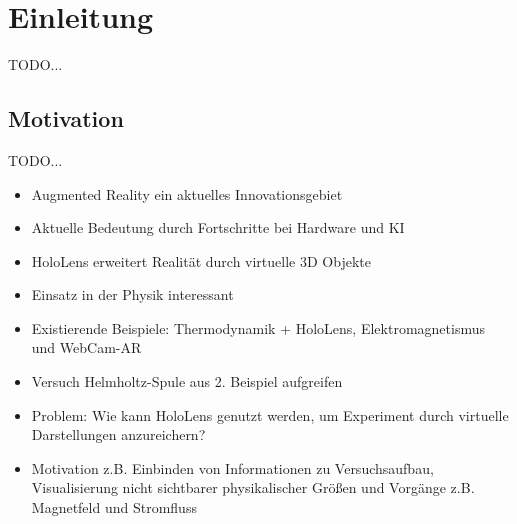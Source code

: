 \section{Einleitung}
\label{sec-1}
\begin{comment}
\begin{center}
	\fbox{
		\parbox{0.9\linewidth}{
			\textit{Ziel des Kapitels:}\\
			Arbeit motivieren, an die Fragestellung heranführen und diese formulieren\\
			\textit{Inhalte:}
			\begin{itemize}
				\item MR kurz vorstellen, aktuelle Bedeutung hervorheben, HoloLens als aktuelles Device und Anhaltspunkt nutzen
				\item Anwendung in der Physik Lehre einleiten und motivieren
				\item Fragestellung, Ziel und Struktur der Arbeit
			\end{itemize}
			
			\textit{Wichtige Literatur:}	
			\begin{itemize}
				\item Physics holo.lab learning experience: using smartglasses for augmented reality labwork to foster the concepts of heat conduction \cite{Strzys18}
				\item Augmenting Microsoft's HoloLens with vuforia tracking for neuronavigation \cite{Frantz18}
				\item HoloMuse: Enhancing Engagement with Archaeological Artifacts Through Gesture-Based Interaction with Holograms \cite{Pollalis17}
			\end{itemize}
	}}
\end{center}
\end{comment}

TODO...

\subsection{Motivation}
\label{sec-1-1}
TODO...
\begin{itemize}
	\item Augmented Reality ein aktuelles Innovationsgebiet
	\item Aktuelle Bedeutung durch Fortschritte bei Hardware und KI
	\item HoloLens erweitert Realität durch virtuelle 3D Objekte
	\item Einsatz in der Physik interessant
	\item Existierende Beispiele: Thermodynamik + HoloLens, Elektromagnetismus und WebCam-AR
	\item Versuch Helmholtz-Spule aus 2. Beispiel aufgreifen
	\item Problem: Wie kann HoloLens genutzt werden, um Experiment durch virtuelle Darstellungen anzureichern?
	\item Motivation z.B. Einbinden von Informationen zu Versuchsaufbau, Visualisierung nicht sichtbarer physikalischer Größen und Vorgänge z.B. Magnetfeld und Stromfluss
\end{itemize}

